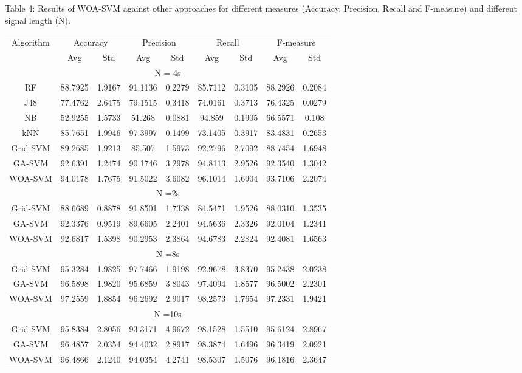 \documentclass{article}
\begin{document}
Table 4: Results of WOA-SVM against other approaches for different measures (Accuracy, Precision, Recall and F-measure) and different signal length (N).

\begin{tabular}{|c|c|c|c|c|c|c|c|c|}\hline
\multirow{2}{*}{Algorithm} & \multicolumn{2}{c|}{Accuracy} & \multicolumn{2}{c|}{Precision} & \multicolumn{2}{c|}{Recall} & \multicolumn{2}{c|}{F-measure} \\ \cline{2-9}
  & Avg & Std & Avg & Std & Avg & Std & Avg & Std \\ \hline
\multicolumn{9}{|c|}{N = 4s} \\ \hline
RF & 88.7925 & 1.9167 & 91.1136 & 0.2279 & 85.7112 & 0.3105 & 88.2926 & 0.2084 \\ \hline
J48 & 77.4762 & 2.6475 & 79.1515 & 0.3418 & 74.0161 & 0.3713 & 76.4325 & 0.0279 \\ \hline
NB & 52.9255 & 1.5733 & 51.268 & 0.0881 & 94.859 & 0.1905 & 66.5571 & 0.108 \\ \hline
kNN & 85.7651 & 1.9946 & 97.3997 & 0.1499 & 73.1405 & 0.3917 & 83.4831 & 0.2653 \\ \hline
Grid-SVM & 89.2685 & 1.9213 & 85.507 & 1.5973 & 92.2796 & 2.7092 & 88.7454 & 1.6948 \\ \hline
GA-SVM & 92.6391 & 1.2474 & 90.1746 & 3.2978 & 94.8113 & 2.9526 & 92.3540 & 1.3042 \\ \hline
WOA-SVM & 94.0178 & 1.7675 & 91.5022 & 3.6082 & 96.1014 & 1.6904 & 93.7106 & 2.2074 \\ \hline
\multicolumn{9}{|c|}{N =2s} \\ \hline
Grid-SVM & 88.6689 & 0.8878 & 91.8501 & 1.7338 & 84.5471 & 1.9526 & 88.0310 & 1.3535 \\ \hline
GA-SVM & 92.3376 & 0.9519 & 89.6605 & 2.2401 & 94.5636 & 2.3326 & 92.0104 & 1.2341 \\ \hline
WOA-SVM & 92.6817 & 1.5398 & 90.2953 & 2.3864 & 94.6783 & 2.2824 & 92.4081 & 1.6563 \\ \hline
\multicolumn{9}{|c|}{N =8s} \\ \hline
Grid-SVM & 95.3284 & 1.9825 & 97.7466 & 1.9198 & 92.9678 & 3.8370 & 95.2438 & 2.0238 \\ \hline
GA-SVM & 96.5898 & 1.9820 & 95.6859 & 3.8043 & 97.4094 & 1.8577 & 96.5002 & 2.2301 \\ \hline
WOA-SVM & 97.2559 & 1.8854 & 96.2692 & 2.9017 & 98.2573 & 1.7654 & 97.2331 & 1.9421 \\ \hline
\multicolumn{9}{|c|}{N =10s} \\ \hline
Grid-SVM & 95.8384 & 2.8056 & 93.3171 & 4.9672 & 98.1528 & 1.5510 & 95.6124 & 2.8967 \\ \hline
GA-SVM & 96.4857 & 2.0354 & 94.4032 & 2.8917 & 98.3874 & 1.6496 & 96.3419 & 2.0921 \\ \hline
WOA-SVM & 96.4866 & 2.1240 & 94.0354 & 4.2741 & 98.5307 & 1.5076 & 96.1816 & 2.3647 \\ \hline
\end{tabular}
\end{document}
